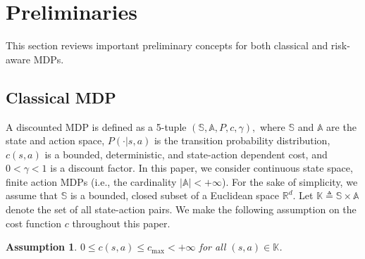 \documentclass[12pt,technote,onecolumn]{IEEEtran}
\newtheorem{assumption}{Assumption}
\begin{document}



\section{Preliminaries}\label{sec2}

This section reviews important preliminary concepts for both classical
and risk-aware MDPs.

\subsection{Classical MDP}\label{sec2.1}
A discounted MDP is defined as a 5-tuple
$
\left(\mathbb{S},\mathbb{A},P,c,\gamma\right),
$
where $\mathbb{S}$ and $\mathbb{A}$ are the state and action space, $P(\cdot|s,a)$ is the transition probability distribution, $c(s,a)$ is a bounded, deterministic, and state-action dependent cost, and $0<\gamma<1$ is a discount factor. In this paper, we consider continuous state space, finite action MDPs (i.e., the cardinality  $|\mathbb{A}|<+\infty$). For the sake of simplicity, we assume that $\mathbb{S}$ is a bounded, closed subset of a Euclidean space $\mathbb{R}^d$. Let $\mathbb{K}\triangleq\mathbb{S}\times\mathbb{A}$ denote the
set of all state-action pairs. We make the following assumption on the cost function $c$ throughout
this paper.
\begin{assumption}
	\label{assu:Bounded_costs}  $0\leq c(s,a)\leq c_{\max}<+\infty$
	for all $\left(s,a\right)\in\mathbb{K}$.
\end{assumption}
\end{document}
